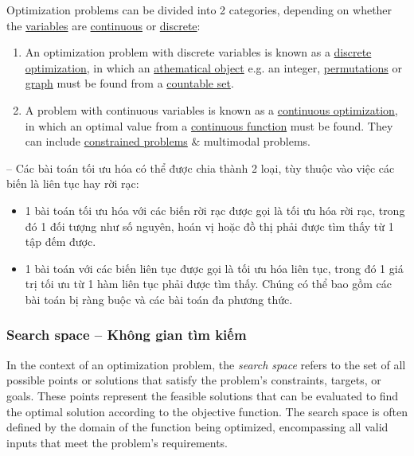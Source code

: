 \documentclass{article}
\begin{document}
Optimization problems can be divided into 2 categories, depending on whether the \href{https://en.wikipedia.org/wiki/Variable_(mathematics)}{variables} are \href{https://en.wikipedia.org/wiki/Continuous_variable}{continuous} or \href{https://en.wikipedia.org/wiki/Discrete_variable}{discrete}:
\begin{enumerate}
	\item An optimization problem with discrete variables is known as a \href{https://en.wikipedia.org/wiki/Discrete_optimization}{discrete optimization}, in which an \href{https://en.wikipedia.org/wiki/Mathematical_object}{athematical object} e.g. an integer, \href{https://en.wikipedia.org/wiki/Permutation}{permutations} or \href{https://en.wikipedia.org/wiki/Graph_(discrete_mathematics)}{graph} must be found from a \href{https://en.wikipedia.org/wiki/Countable_set}{countable set}.
	\item A problem with continuous variables is known as a \href{https://en.wikipedia.org/wiki/Continuous_optimization}{continuous optimization}, in which an optimal value from a \href{https://en.wikipedia.org/wiki/Continuous_function}{continuous function} must be found. They can include \href{https://en.wikipedia.org/wiki/Constrained_optimization}{constrained problems} \& multimodal problems.
\end{enumerate}
-- Các bài toán tối ưu hóa có thể được chia thành 2 loại, tùy thuộc vào việc các biến là liên tục hay rời rạc:
\begin{itemize}
	\item 1 bài toán tối ưu hóa với các biến rời rạc được gọi là tối ưu hóa rời rạc, trong đó 1 đối tượng như số nguyên, hoán vị hoặc đồ thị phải được tìm thấy từ 1 tập đếm được.
	\item 1 bài toán với các biến liên tục được gọi là tối ưu hóa liên tục, trong đó 1 giá trị tối ưu từ 1 hàm liên tục phải được tìm thấy. Chúng có thể bao gồm các bài toán bị ràng buộc và các bài toán đa phương thức.
\end{itemize}


\subsubsection{Search space -- Không gian tìm kiếm}
In the context of an optimization problem, the {\it search space} refers to the set of all possible points or solutions that satisfy the problem's constraints, targets, or goals. These points represent the feasible solutions that can be evaluated to find the optimal solution according to the objective function. The search space is often defined by the domain of the function being optimized, encompassing all valid inputs that meet the problem's requirements.
\end{document}
